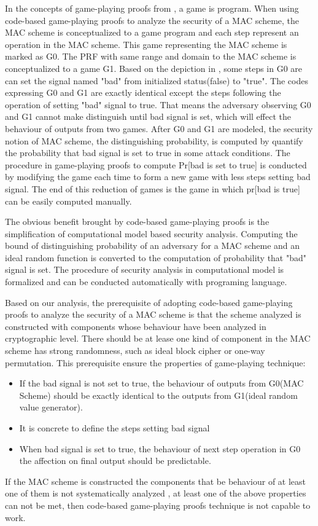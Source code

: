 \documentclass{article}
\begin{document}
In the concepts of game-playing proofs from \cite{code-game}, a game is program. When using code-based game-playing proofs to analyze the security of a MAC scheme, the MAC scheme is conceptualized to a game program and each step represent an operation in the MAC scheme. This game representing the MAC scheme is marked as G0. The PRF with same range and domain to the MAC scheme is conceptualized to a game G1.  Based on the depiction in \cite{code-game}, some steps in G0 are can set the signal named "bad" from initialized status(false) to "true". The codes expressing  G0 and G1 are exactly identical except the steps following the operation of setting "bad" signal to true. That means the adversary observing G0 and G1 cannot make distinguish until bad signal is set, which will effect the behaviour of outputs from two games. After G0 and G1 are modeled, the security notion of MAC scheme, the distinguishing probability, is computed by quantify the probability that bad signal is set to true in some attack conditions. The procedure in game-playing proofs to compute Pr[bad is set to true] is conducted by modifying the game each time to form a new game with less steps setting bad signal. The end of this reduction of games is the game in which pr[bad is true] can be easily computed manually.  

The obvious benefit brought by code-based game-playing proofs is the
simplification of computational model based security analysis. Computing the bound
of distinguishing probability of an adversary for a MAC scheme and an ideal
random function is converted to the computation of probability that "bad" signal
is set. The procedure of security analysis in computational model is formalized
and can be conducted automatically with programing language.

Based on our analysis, the prerequisite of adopting code-based game-playing proofs to analyze the
security of a MAC scheme is that the scheme analyzed is constructed with components whose behaviour have been analyzed in cryptographic
level. There should be at lease one kind of component in the MAC scheme has strong randomness, such as ideal block cipher or one-way permutation. This prerequisite ensure the properties of game-playing technique:
\begin{itemize}
	\item If the bad signal is not set to true, the behaviour of outputs from G0(MAC Scheme) should be exactly identical to the outputs from G1(ideal random value generator). 
	\item It is concrete to define the steps setting bad signal 
	\item When bad signal is set to true, the behaviour of next step operation in G0 the affection on final output should
be predictable.   
\end{itemize}
If the MAC scheme is constructed the components that be behaviour of at least one of them is not systematically analyzed , at least one
of the above properties can not be met, then code-based game-playing proofs
technique is not capable to work. 
\end{document}
